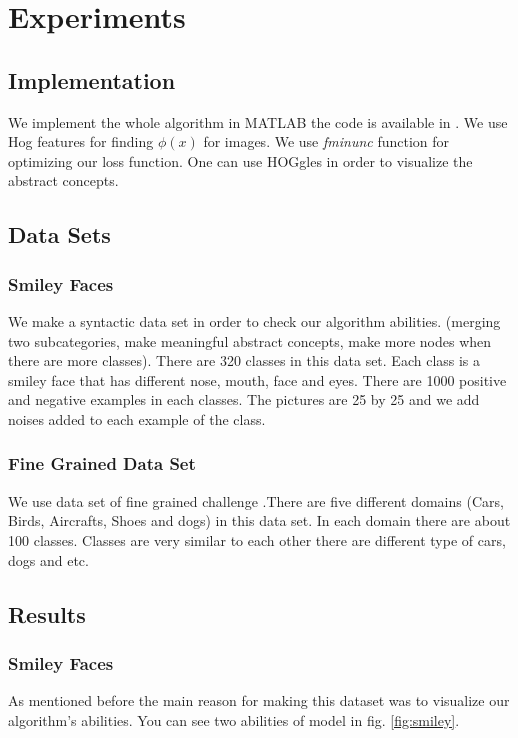 \documentclass[10pt,twocolumn,letterpaper]{article}
\begin{document}
\section {Experiments}
 
 \subsection {Implementation}
 We implement the whole algorithm in MATLAB the code is available in \cite{website:sourceCode}. We use Hog features for finding $\phi(x)$ for images. We use \textit{fminunc} function for optimizing our loss function.
 One can use HOGgles \cite{hoggles} in order to visualize the  abstract concepts.
 
 \subsection{Data Sets}
 \subsubsection{Smiley Faces}
 We make a syntactic data set in order to check our algorithm abilities. (merging two subcategories, make meaningful abstract concepts, make more nodes when there are more classes). There are 320 classes in this data set. Each class is a smiley face that has different nose, mouth, face and eyes. There are 1000 positive and negative examples in each classes. The pictures are 25 by 25 and we add noises added to each example of the class.
  
 \subsubsection{Fine Grained Data Set}
 We use data set of fine grained challenge \cite{dataSet}.There are five different domains (Cars, Birds, Aircrafts, Shoes and dogs) in this data set. In each domain there are about 100 classes. Classes are very similar to each other there are different type of cars, dogs and etc.
 \subsection{Results}
 \subsubsection{Smiley Faces}
 
 As mentioned before the main reason for making this dataset was to visualize our algorithm's abilities. You can see two abilities of model in fig. \ref{fig:smiley}.
 
\end{document}
